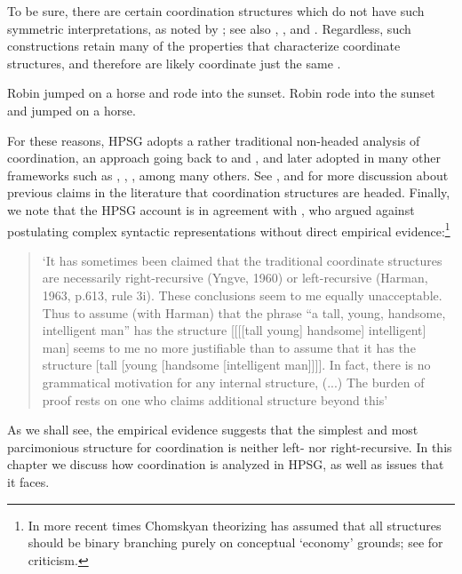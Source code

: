 \documentclass[output=paper]{langsci/langscibook}
\begin{document}
\noindent
To be sure, there are certain coordination structures which do not have such symmetric 
interpretations, as noted by \citet{ross67}; see also
\citet{goldsmith}, \citet{lakoff86}, and \citet{levinprince86}.
Regardless, such constructions retain many of the properties that characterize coordinate structures, and therefore are likely 
coordinate just the same \citep[Ch.5]{kehler}.

\begin{exe}
\ex
\begin{xlista}
\ex Robin jumped on a horse and rode into the sunset.
\ex Robin rode into the sunset and jumped on a horse.
\end{xlista}
\end{exe}

For these reasons, HPSG adopts a rather traditional non-headed analysis of coordination, an approach  going back
to \citet[195]{bloom} and  \citet{ross67}, and later adopted in many other frameworks such as \citet{pesetsky}, \citet{gazdarc},  \citet[1275]{rodney}, among many others. 
See \citet{borsley94}, \citet{Borsley:05} and 
\citet[Ch.2]{chavesthesis} for more discussion about previous claims in the literature that coordination structures are headed.
Finally, we note that the HPSG account is in agreement with \citet[196]{chom65}, who argued against postulating complex syntactic representations without direct empirical evidence:\footnote{In more recent times Chomskyan theorizing has assumed that all structures should be binary branching purely on conceptual `economy' grounds; see \citep{Johnson:Lappin:99} for criticism.}

\begin{quote}
`It has sometimes been claimed that the traditional coordinate structures are necessarily right-recursive (Yngve, 1960) or left-recursive (Harman, 1963, p.613, rule 3i). These conclusions seem to me equally unacceptable. Thus to assume (with Harman) that the phrase “a tall, young, handsome, intelligent man” has the structure [[[[tall young] handsome] intelligent] man] seems to me no more justifiable than to assume that it has
the structure [tall [young [handsome [intelligent man]]]]. In fact, there is no grammatical motivation for any internal structure, (...) The burden of proof rests on one who claims additional structure
beyond this'\\
\citep[196,197]{chom65}
\end{quote}

\noindent
As we shall see, the empirical evidence suggests that
the simplest and most parcimonious structure for coordination is neither left- nor right-recursive.
In this chapter we discuss how coordination is analyzed in HPSG, as well as issues that it faces.
\end{document}
